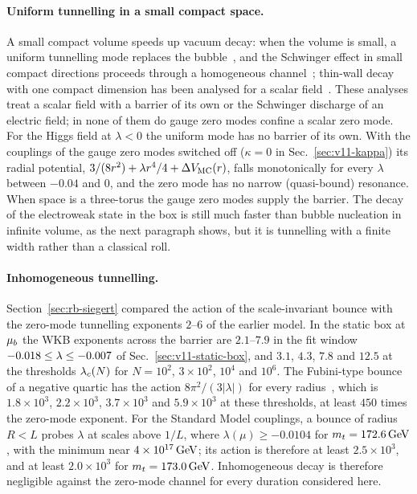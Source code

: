 \paragraph{Uniform tunnelling in a small compact space.}
A small compact volume speeds up vacuum decay: when the volume is small, a uniform tunnelling mode replaces the bubble~\cite{Hassan:2026cmp}, and the Schwinger effect in small compact directions proceeds through a homogeneous channel~\cite{Brown:2015kgj}; thin-wall decay with one compact dimension has been analysed for a scalar field~\cite{Antoniadis:2024ent}.
These analyses treat a scalar field with a barrier of its own or the Schwinger discharge of an electric field; in none of them do gauge zero modes confine a scalar zero mode.
For the Higgs field at $\lambda<0$ the uniform mode has no barrier of its own.
With the couplings of the gauge zero modes switched off ($\kappa=0$ in Sec.~\ref{sec:v11-kappa}) its radial potential, $3/(8r^2)+\lambda r^4/4+\Delta V_{\rm MC}(r)$, falls monotonically for every $\lambda$ between $-0.04$ and $0$, and the zero mode has no narrow (quasi-bound) resonance. %
When space is a three-torus the gauge zero modes supply the barrier.
The decay of the electroweak state in the box is still much faster than bubble nucleation in infinite volume, as the next paragraph shows, but it is tunnelling with a finite width rather than a classical roll.

\paragraph{Inhomogeneous tunnelling.}
Section~\ref{sec:rb-siegert} compared the action of the scale-invariant bounce with the zero-mode tunnelling exponents $2$--$6$ of the earlier model.
In the static box at $\mu_b$ the WKB exponents across the barrier are $2.1$--$7.9$ in the fit window $-0.018\le\lambda\le-0.007$ of Sec.~\ref{sec:v11-static-box}, and $3.1$, $4.3$, $7.8$ and $12.5$ at the thresholds $\lambda_c(N)$ for $N=10^2$, $3\times10^2$, $10^4$ and $10^6$. %
The Fubini-type bounce of a negative quartic has the action $8\pi^2/(3|\lambda|)$ for every radius~\cite{Andreassen:2017rzq}, which is $1.8\times10^3$, $2.2\times10^3$, $3.7\times10^3$ and $5.9\times10^3$ at these thresholds, at least $450$ times the zero-mode exponent. %
For the Standard Model couplings, a bounce of radius $R<L$ probes $\lambda$ at scales above $1/L$, where $\lambda(\mu)\ge-0.0104$ for $m_t=172.6\,\mathrm{GeV}$, with the minimum near $4\times10^{17}\,\mathrm{GeV}$; its action is therefore at least $2.5\times10^3$, and at least $2.0\times10^3$ for $m_t=173.0\,\mathrm{GeV}$. %
Inhomogeneous decay is therefore negligible against the zero-mode channel for every duration considered here.

